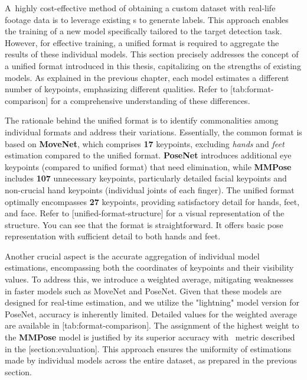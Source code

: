 A~highly cost-effective method of obtaining a custom dataset with real-life footage data is to leverage existing \NN\-s to generate labels. This approach enables the training of a new model specifically tailored to the target detection task. However, for effective training, a unified format is required to aggregate the results of these individual models. This section precisely addresses the concept of a unified format introduced in this thesis, capitalizing on the strengths of existing models. As explained in the previous chapter, each model estimates a different number of keypoints, emphasizing different qualities. Refer to [tab:format-comparison] for a comprehensive understanding of these differences.

The rationale behind the unified format is to identify commonalities among individual formats and address their variations. Essentially, the common format is based on {\bf MoveNet}, which comprises {\bf 17} keypoints, excluding {\em hands} and {\em feet} estimation compared to the unified format. {\bf PoseNet} introduces additional eye keypoints (compared to unified format) that need elimination, while {\bf MMPose} includes {\bf 107} unnecessary keypoints, particularly detailed facial keypoints and non-crucial hand keypoints (individual joints of each finger). The unified format optimally encompasses {\bf 27} keypoints, providing satisfactory detail for hands, feet, and face. Refer to [unified-format-structure] for a visual representation of the structure. You can see that the format is straightforward. It offers basic pose representation with sufficient detail to both hands and feet.

Another crucial aspect is the accurate aggregation of individual model estimations, encompassing both the coordinates of keypoints and their visibility values. To address this, we introduce a weighted average, mitigating weaknesses in faster models such as MoveNet and PoseNet. Given that these models are designed for real-time estimation, and we utilize the "lightning" model version for PoseNet, accuracy is inherently limited. Detailed values for the weighted average are available in [tab:format-comparison]. The assignment of the highest weight to the {\bf MMPose} model is justified by its superior accuracy with \APE\ metric described in the [section:evaluation]. This approach ensures the uniformity of estimations made by individual models across the entire dataset, as prepared in the previous section.

